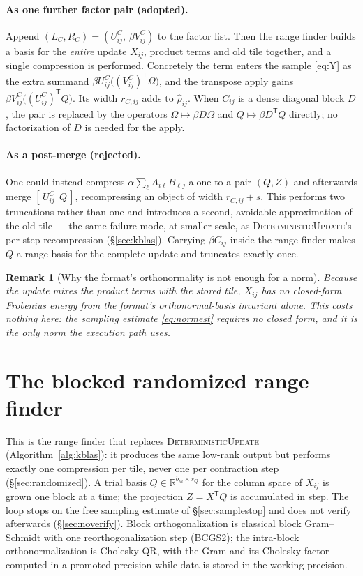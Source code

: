 \documentclass[11pt]{article}
\newtheorem{remark}{Remark}
\newcommand{\R}{\mathbb{R}}
\newcommand{\T}{\mathsf{T}}
\begin{document}
\paragraph{As one further factor pair (adopted).}
Append $(L_C,R_C)=(U^C_{ij},\,\beta V^C_{ij})$ to the factor list. Then the range
finder builds a basis for the \emph{entire} update $X_{ij}$, product terms and
old tile together, and a single compression is performed. Concretely the term
enters the sample \eqref{eq:Y} as the extra summand
$\beta U^C_{ij}\bigl((V^C_{ij})^{\T}\Omega\bigr)$, and the transpose apply gains
$\beta V^C_{ij}\bigl((U^C_{ij})^{\T}Q\bigr)$. Its width $r_{C,ij}$ adds to $\hat\rho_{ij}$. When $C_{ij}$ is a dense diagonal block $D$, the pair is
replaced by the operators
$\Omega\mapsto\beta D\Omega$ and $Q\mapsto\beta D^{\T}Q$ directly; no
factorization of $D$ is needed for the apply.

\paragraph{As a post-merge (rejected).}
One could instead compress $\alpha\sum_\ell A_{i\ell}B_{\ell j}$ alone to a pair
$(Q,Z)$ and afterwards merge $[\,U^C_{ij}\ \ Q\,]$, recompressing an object of
width $r_{C,ij}+s$. This performs two truncations rather than one and introduces
a second, avoidable approximation of the old tile --- the same failure mode, at
smaller scale, as \textsc{DeterministicUpdate}'s per-step recompression
(\S\ref{sec:kblas}). Carrying $\beta C_{ij}$ inside the range finder makes $Q$
a range basis for the complete update and truncates exactly once.

\begin{remark}[Why the format's orthonormality is not enough for a norm]
\label{rem:betanorm}
Because the update mixes the product terms with the stored tile, $X_{ij}$ has no
closed-form Frobenius energy from the format's orthonormal-basis invariant alone.
This costs nothing here: the sampling estimate \eqref{eq:normest} requires no
closed form, and it is the only norm the execution path uses.
\end{remark}

\section{The blocked randomized range finder}
\label{sec:ara}

This is the range finder that replaces \textsc{DeterministicUpdate}
(Algorithm~\ref{alg:kblas}): it produces the same low-rank output but performs
exactly one compression per tile, never one per contraction step
(\S\ref{sec:randomized}). A trial basis $Q\in\R^{b_m\times s_Q}$ for the
column space of $X_{ij}$ is grown one block at a time; the projection
$Z=X^{\T}Q$ is accumulated in step. The loop stops on the free sampling
estimate of \S\ref{sec:samplestop} and does not verify afterwards
(\S\ref{sec:noverify}). Block orthogonalization is classical block
Gram--Schmidt with one reorthogonalization step (BCGS2); the intra-block
orthonormalization is Cholesky QR, with the Gram and its Cholesky factor computed
in a promoted precision while data is stored in the working precision.
\end{document}
